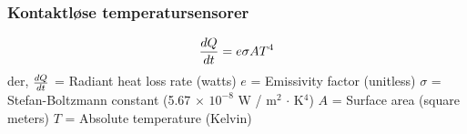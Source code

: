 \documentclass[aspectratio=169,xcolor=dvipsnames]{beamer}
\begin{document}
%
%
%
%
%
%
%
%
%
%
\begin{frame}
	\frametitle{Kontaktløse temperatursensorer}
$${dQ \over dt} = e \sigma A T^4$$
\vskip 5pt 
der,
\vskip 5pt 
$dQ \over dt$ = Radiant heat loss rate (watts)
\vskip 5pt 
$e$ = Emissivity factor (unitless)
\vskip 5pt 
$\sigma$ = Stefan-Boltzmann constant (5.67 $\times$ $10^{-8}$ W / m$^{2}$ $\cdot$ K$^{4}$)
\vskip 5pt 
$A$ = Surface area (square meters)
\vskip 5pt 
$T$ = Absolute temperature (Kelvin)
\vskip 5pt 

\end{frame}
\end{document}
